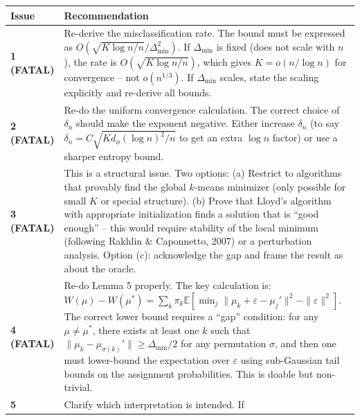 \documentclass[
  12pt,
]{article}
\begin{document}
\begin{longtable}[]{@{}
  >{\raggedright\arraybackslash}p{}
  >{\raggedright\arraybackslash}p{}@{}}
\toprule\noalign{}
\begin{minipage}[b]{\linewidth}\raggedright
Issue
\end{minipage} & \begin{minipage}[b]{\linewidth}\raggedright
Recommendation
\end{minipage} \\
\midrule\noalign{}
\endhead
\bottomrule\noalign{}
\endlastfoot
\textbf{1 (FATAL)} & Re-derive the misclassification rate. The bound
must be expressed as \(O(\sqrt{K \log n / n} / \Delta_{\min}^2)\). If
\(\Delta_{\min}\) is fixed (does not scale with \(n\)), the rate is
\(O(\sqrt{K \log n / n})\), which gives \(K = o(n / \log n)\) for
convergence -- not \(o(n^{1/3})\). If \(\Delta_{\min}\) scales, state
the scaling explicitly and re-derive all bounds. \\
\textbf{2 (FATAL)} & Re-do the uniform convergence calculation. The
correct choice of \(\delta_n\) should make the exponent negative. Either
increase \(\delta_n\) (to say
\(\delta_n = C \sqrt{K d_\phi (\log n)^2 / n}\) to get an extra
\(\log n\) factor) or use a sharper entropy bound. \\
\textbf{3 (FATAL)} & This is a structural issue. Two options: (a)
Restrict to algorithms that provably find the global \(k\)-means
minimizer (only possible for small \(K\) or special structure). (b)
Prove that Lloyd's algorithm with appropriate initialization finds a
solution that is ``good enough'' -- this would require stability of the
local minimum (following Rakhlin \& Caponnetto, 2007) or a perturbation
analysis. Option (c): acknowledge the gap and frame the result as about
the oracle. \\
\textbf{4 (FATAL)} & Re-do Lemma 5 properly. The key calculation is:
\(W(\mu) - W(\mu^*) = \sum_k \pi_k \mathbb{E}[\min_j \|\mu_k + \varepsilon - \mu_j'\|^2 - \|\varepsilon\|^2]\).
The correct lower bound requires a ``gap'' condition: for any
\(\mu \neq \mu^*\), there exists at least one \(k\) such that
\(\|\mu_k - \mu_{\sigma(k)}'\| \geq \Delta_{\min}/2\) for any
permutation \(\sigma\), and then one must lower-bound the expectation
over \(\varepsilon\) using sub-Gaussian tail bounds on the assignment
probabilities. This is doable but non-trivial. \\
\textbf{5} & Clarify which interpretation is intended. If

\end{longtable}
\end{document}
